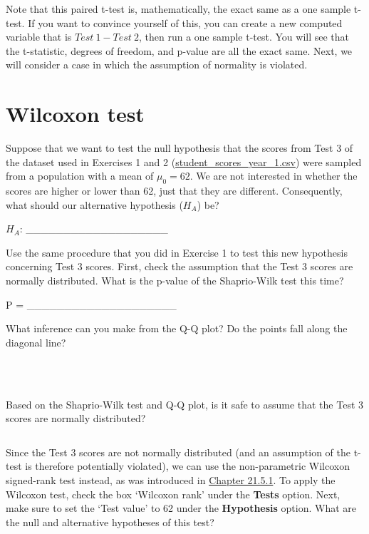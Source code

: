 \documentclass[
]{scrbook}
\begin{document}
Note that this paired t-test is, mathematically, the exact same as a one sample t-test.
If you want to convince yourself of this, you can create a new computed variable that is \(Test\:1 - Test\:2\), then run a one sample t-test.
You will see that the t-statistic, degrees of freedom, and p-value are all the exact same.
Next, we will consider a case in which the assumption of normality is violated.

\hypertarget{wilcoxon-test-1}{%
\section{Wilcoxon test}\label{wilcoxon-test-1}}

Suppose that we want to test the null hypothesis that the scores from Test 3 of the dataset used in Exercises 1 and 2 (\href{https://raw.githubusercontent.com/bradduthie/statistical_techniques/main/data/student_scores_year_1.csv}{student\_scores\_year\_1.csv}) were sampled from a population with a mean of \(\mu_{0} = 62\).
We are not interested in whether the scores are higher or lower than 62, just that they are different.
Consequently, what should our alternative hypothesis (\(H_{A}\)) be?

\(H_{A}\): \_\_\_\_\_\_\_\_\_\_\_\_\_\_\_\_\_\_\_

Use the same procedure that you did in Exercise 1 to test this new hypothesis concerning Test 3 scores.
First, check the assumption that the Test 3 scores are normally distributed.
What is the p-value of the Shaprio-Wilk test this time?

P = \_\_\_\_\_\_\_\_\_\_\_\_\_\_\_\_\_\_\_\_

What inference can you make from the Q-Q plot?
Do the points fall along the diagonal line?

\begin{verbatim}



\end{verbatim}

Based on the Shaprio-Wilk test and Q-Q plot, is it safe to assume that the Test 3 scores are normally distributed?

\begin{verbatim}

\end{verbatim}

Since the Test 3 scores are not normally distributed (and an assumption of the t-test is therefore potentially violated), we can use the non-parametric Wilcoxon signed-rank test instead, as was introduced in \protect\hyperlink{wilcoxon-test}{Chapter 21.5.1}.
To apply the Wilcoxon test, check the box `Wilcoxon rank' under the \textbf{Tests} option.
Next, make sure to set the `Test value' to 62 under the \textbf{Hypothesis} option.
What are the null and alternative hypotheses of this test?
\end{document}

